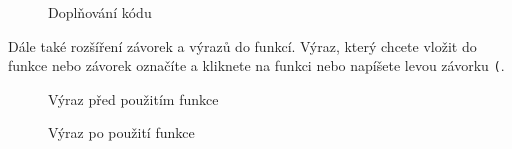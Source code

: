 \documentclass[a4paper, 11pt]{article}
\begin{document}
\begin{figure}[H]
    \centering
    \caption{Doplňování kódu}
\end{figure}

Dále také rozšíření závorek a výrazů do funkcí. Výraz, který chcete
vložit do funkce nebo závorek označíte a kliknete na funkci nebo
napíšete levou závorku \texttt{(}.

\begin{figure}[H]
    \centering
    \caption{Výraz před použitím funkce}
\end{figure}

\begin{figure}[H]
    \centering
    \caption{Výraz po použití funkce}
\end{figure}
\end{document}

